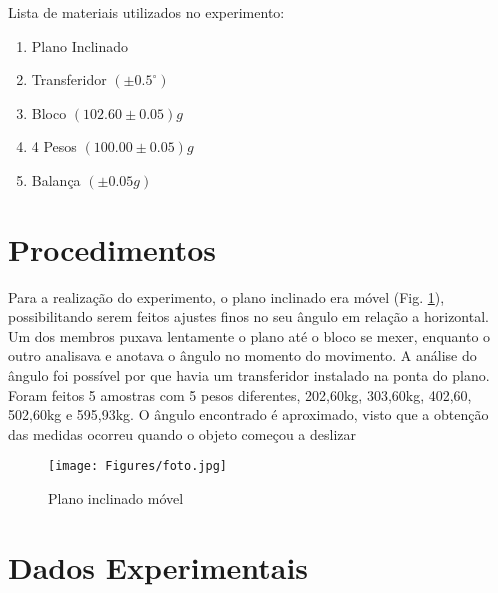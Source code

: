 \documentclass[12pt]{article}
\numberwithin{equation}{section} %
\begin{document}
Lista de materiais utilizados no experimento:
 \begin{enumerate}
    \item Plano Inclinado
    \item Transferidor $(\pm 0.5^\circ)$
    \item Bloco $(102.60 \pm 0.05)g$
    \item 4 Pesos $(100.00 \pm 0.05)g$
    \item Balança $(\pm 0.05g)$

 \end{enumerate}
\section{Procedimentos}
Para a realização do experimento, o plano inclinado era móvel (Fig. \ref{fig:foto}), possibilitando serem feitos ajustes finos no seu ângulo em relação a horizontal. Um dos membros puxava lentamente o plano até o bloco se mexer, enquanto o outro analisava e anotava o ângulo no momento do movimento. A análise do ângulo foi possível por que havia um transferidor instalado na ponta do plano. Foram feitos 5 amostras com 5 pesos diferentes, 202,60kg, 303,60kg, 402,60, 502,60kg e 595,93kg.
O ângulo encontrado é aproximado, visto que a obtenção das medidas ocorreu quando o objeto começou a deslizar

\begin{figure}[H]
\centering
\texttt{[image: Figures/foto.jpg]}
\caption{Plano inclinado móvel}
\label{fig:foto}
\end{figure}

\section{Dados Experimentais}
\end{document}
